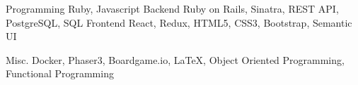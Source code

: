 \vspace{-1.0mm}

\begin{cvskills}

    \cvskill
    {Programming}
    {Ruby, Javascript} %
    \cvskill
    {Backend} %
    {Ruby on Rails, Sinatra, REST API, PostgreSQL, SQL} %
    \cvskill
    {Frontend} %
    {React, Redux, HTML5, CSS3, Bootstrap, Semantic UI} %

    \cvskill
    {Misc.} %
    {Docker, Phaser3, Boardgame.io, LaTeX, Object Oriented Programming, Functional Programming} %

\end{cvskills}
